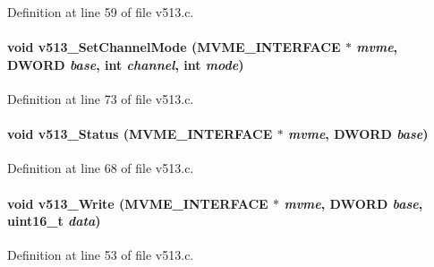 Definition at line 59 of file v513.c.
\paragraph[{v513\_\-SetChannelMode}]{\setlength{\rightskip}{0pt plus 5cm}void v513\_\-SetChannelMode ({\bf MVME\_\-INTERFACE} $\ast$ {\em mvme}, \/  {\bf DWORD} {\em base}, \/  int {\em channel}, \/  int {\em mode})}\hfill\label{v513_8h_aab9cddf392795f3f9e744bb4d0ef9236}


Definition at line 73 of file v513.c.
\paragraph[{v513\_\-Status}]{\setlength{\rightskip}{0pt plus 5cm}void v513\_\-Status ({\bf MVME\_\-INTERFACE} $\ast$ {\em mvme}, \/  {\bf DWORD} {\em base})}\hfill\label{v513_8h_ab0b49bcd59c5d1a7225a8b2dc65078ab}


Definition at line 68 of file v513.c.
\paragraph[{v513\_\-Write}]{\setlength{\rightskip}{0pt plus 5cm}void v513\_\-Write ({\bf MVME\_\-INTERFACE} $\ast$ {\em mvme}, \/  {\bf DWORD} {\em base}, \/  uint16\_\-t {\em data})}\hfill\label{v513_8h_aeb673802fc74239f08841a9dee0921d6}


Definition at line 53 of file v513.c.